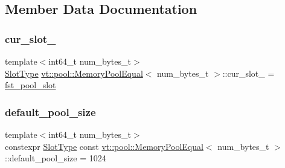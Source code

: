 \subsection{Member Data Documentation}
\mbox{\label{structvt_1_1pool_1_1_memory_pool_equal_aa9298df54e6a541e9dd8960befbf46a5}} 
\subsubsection{\texorpdfstring{cur\+\_\+slot\+\_\+}{cur\_slot\_}}
{\footnotesize\ttfamily template$<$int64\+\_\+t num\+\_\+bytes\+\_\+t$>$ \\
\hyperlink{structvt_1_1pool_1_1_memory_pool_equal_a101fdcb943d0cb0863cf17655e0b4e1c}{Slot\+Type} \hyperlink{structvt_1_1pool_1_1_memory_pool_equal}{vt\+::pool\+::\+Memory\+Pool\+Equal}$<$ num\+\_\+bytes\+\_\+t $>$\+::cur\+\_\+slot\+\_\+ = \hyperlink{structvt_1_1pool_1_1_memory_pool_equal_ae0435baf515fefccc015b600357bc6bb}{fst\+\_\+pool\+\_\+slot}\hspace{0.3cm}{\ttfamily [private]}}

\mbox{\label{structvt_1_1pool_1_1_memory_pool_equal_a67dae02a7795b182a7302b9eb34924e7}} 
\subsubsection{\texorpdfstring{default\+\_\+pool\+\_\+size}{default\_pool\_size}}
{\footnotesize\ttfamily template$<$int64\+\_\+t num\+\_\+bytes\+\_\+t$>$ \\
constexpr \hyperlink{structvt_1_1pool_1_1_memory_pool_equal_a101fdcb943d0cb0863cf17655e0b4e1c}{Slot\+Type} const \hyperlink{structvt_1_1pool_1_1_memory_pool_equal}{vt\+::pool\+::\+Memory\+Pool\+Equal}$<$ num\+\_\+bytes\+\_\+t $>$\+::default\+\_\+pool\+\_\+size = 1024\hspace{0.3cm}{\ttfamily [static]}}

